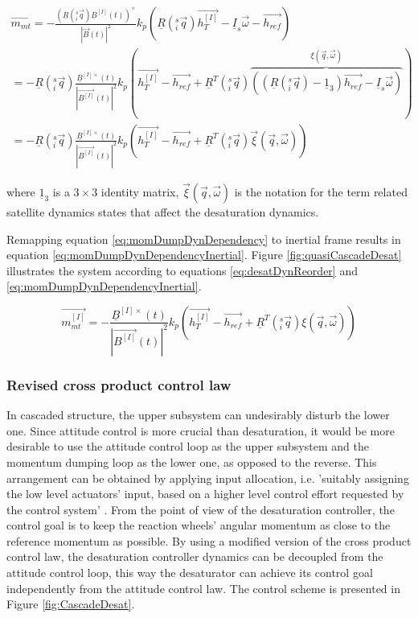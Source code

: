 		
\begin{align}
\nonumber \vec{m_{mt}} = 
- \frac{(\underline{R}(^s_i\vec{ q}) \underline{B}^{[I]}(t))^\times}{|\vec{B}(t) |^2} k_p\left(\underline{R}(^s_i\vec{ q}) \vec{h_{T}^{[I]}} -  \underline{I}_s \vec{\omega} - \vec{h_{ref}}\right)  \\
\nonumber =
-\underline{R}(^s_i\vec{ q})  \frac{\underline{B}^{[I]\times}(t)}{|\vec{B^{[I]}}(t) |^2} k_p\left(\vec{h_{T}^{[I]}} - \vec{h_{ref}} + \underline{R}^T(^s_i\vec{ q}) \overbrace{
	\left( \left( \underline{R}(^s_i\vec{ q}) - \underline{1}_3 \right) \vec{h_{ref}} - \underline{I}_s\vec{\omega} \right)}^{\xi(\vec{q}, \vec{\omega})} \right)\\
= -\underline{R}(^s_i\vec{ q})  \frac{\underline{B}^{[I]\times}(t)}{|\vec{B^{[I]}}(t) |^2} k_p\left(\vec{h_{T}^{[I]}} - \vec{h_{ref}} + \underline{R}^T(^s_i\vec{ q}) \vec{\xi}(\vec{q}, \vec{\omega}) \right)
\label{eq:momDumpDynDependency}
\end{align}		

where $\underline{1}_3$ is a $3\times3$ identity matrix, $\vec{\xi}(\vec{q}, \vec{\omega})$ is the notation for the term related satellite dynamics states that affect the desaturation dynamics.

Remapping equation \ref{eq:momDumpDynDependency} to inertial frame results in equation  \ref{eq:momDumpDynDependencyInertial}. Figure \ref{fig:quasiCascadeDesat} illustrates the system according to equations \ref{eq:desatDynReorder} and \ref{eq:momDumpDynDependencyInertial}.

\begin{equation}
\label{eq:momDumpDynDependencyInertial}
\vec{m_{mt}^{[I]}} = -\frac{\underline{B}^{[I]\times}(t)}{|\vec{B^{[I]}}(t) |^2} k_p 
\left(\vec{h_{T}^{[I]}} - \vec{h_{ref}} + \underline{R}^T(^s_i\vec{ q}) \xi(\vec{q}, \vec{\omega}) \right) 
	\end{equation}			

\subsubsection{Revised cross product control law}

In cascaded structure, the upper subsystem can undesirably disturb the lower one.
Since attitude control is more crucial than desaturation, it would be more desirable to use the attitude control loop as the upper subsystem and the momentum dumping loop as the lower one, as opposed to the reverse. This arrangement can be obtained by applying input allocation, i.e. 'suitably assigning the low level actuators' input, based on a higher level control effort requested by the control system' \cite{JOHANSEN20131087}. From the point of view of the desaturation controller, the control goal is to keep the reaction wheels' angular momentum as close to the reference momentum as possible. By using a modified version of the cross product control law, the desaturation controller dynamics can be decoupled from the attitude control loop, this way the desaturator can achieve its  control goal independently from the attitude control law. The control scheme is presented in Figure \ref{fig:CascadeDesat}.

